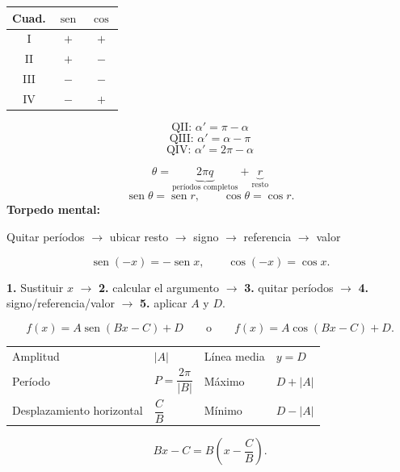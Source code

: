 \documentclass[12pt,letterpaper]{article}
\providecommand{\sen}{\operatorname{sen}}
\begin{document}
\vspace{0.25cm}
\noindent
\begin{minipage}[t]{0.49\textwidth}
\begin{formulabox}
\begin{center}
\renewcommand{\arraystretch}{1.25}
\begin{tabular}{c|cc}
Cuad. & $\sen$ & $\cos$ \\
\midrule
I & $+$ & $+$ \\
II & $+$ & $-$ \\
III & $-$ & $-$ \\
IV & $-$ & $+$
\end{tabular}
\end{center}
\[
\text{QII: }\alpha'=\pi-\alpha
\]
\[
\text{QIII: }\alpha'=\alpha-\pi
\]
\[
\text{QIV: }\alpha'=2\pi-\alpha
\]
\end{formulabox}
\end{minipage}
\hfill
\begin{minipage}[t]{0.49\textwidth}
\begin{formulabox}
\[
\theta=
\underbrace{2\pi q}_{\text{períodos completos}}
+
\underbrace{r}_{\text{resto}}
\]
\[
\sen\theta=\sen r,
\qquad
\cos\theta=\cos r.
\]
\vspace{0.1cm}
\textbf{Torpedo mental:}

\centering
\small
Quitar períodos $\rightarrow$ ubicar resto $\rightarrow$ signo $\rightarrow$ referencia $\rightarrow$ valor

\normalsize
\vspace{0.1cm}
\[
\sen(-x)=-\sen x,
\qquad
\cos(-x)=\cos x.
\]
\end{formulabox}
\end{minipage}

\vspace{0.25cm}
\begin{estrategiabox}
\textbf{1.} Sustituir $x$
$\rightarrow$
\textbf{2.} calcular el argumento
$\rightarrow$
\textbf{3.} quitar períodos
$\rightarrow$
\textbf{4.} signo/referencia/valor
$\rightarrow$
\textbf{5.} aplicar $A$ y $D$.
\end{estrategiabox}

\vspace{0.25cm}
\begin{formulabox}
\[
f(x)=A\sen(Bx-C)+D
\qquad\text{o}\qquad
f(x)=A\cos(Bx-C)+D.
\]
\begin{center}
\renewcommand{\arraystretch}{1.4}
\begin{tabular}{ll@{\qquad}ll}
Amplitud & $|A|$ & Línea media & $y=D$ \\
Período & $P=\dfrac{2\pi}{|B|}$ & Máximo & $D+|A|$ \\
Desplazamiento horizontal & $\dfrac{C}{B}$ & Mínimo & $D-|A|$
\end{tabular}
\end{center}
\[
Bx-C=B\left(x-\frac{C}{B}\right).
\]
\end{formulabox}
\end{document}
